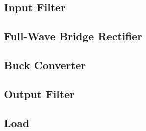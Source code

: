 \documentclass[conference]{IEEEtran}
\begin{document}
\subsection{Input Filter}
\subsection{Full-Wave Bridge Rectifier}
\subsection{Buck Converter}
\subsection{Output Filter}
\subsection{Load}

\nocite{*}


\end{document}

